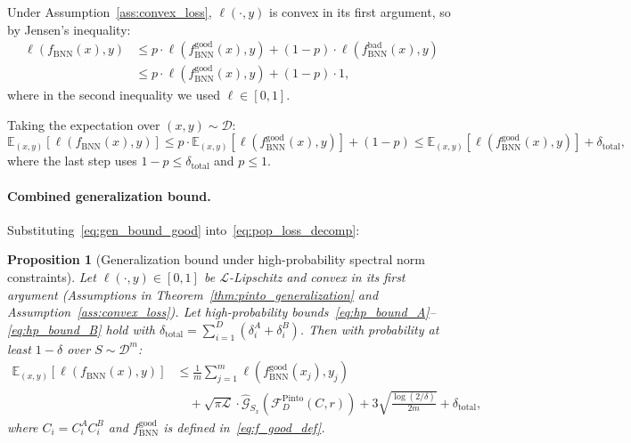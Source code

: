 \documentclass{article}
\theoremstyle{plain}
\newtheorem{proposition}[theorem]{Proposition}
\theoremstyle{definition}
\theoremstyle{remark}
\begin{document}
Under Assumption~\ref{ass:convex_loss}, $\ell(\cdot, y)$ is convex in its first argument, so by Jensen's inequality:
\begin{align}
    \ell(f_{\mathrm{BNN}}(x), y)
    &\le p \cdot \ell(f_{\mathrm{BNN}}^{\text{good}}(x), y) + (1-p) \cdot \ell(f_{\mathrm{BNN}}^{\text{bad}}(x), y) \nonumber \\
    &\le p \cdot \ell(f_{\mathrm{BNN}}^{\text{good}}(x), y) + (1-p) \cdot 1, \label{eq:convexity_bound}
\end{align}
where in the second inequality we used $\ell \in [0,1]$.

Taking the expectation over $(x,y) \sim \mathcal{D}$:
\begin{equation}\label{eq:pop_loss_decomp}
    \mathbb{E}_{(x,y)}[\ell(f_{\mathrm{BNN}}(x), y)]
    \le p \cdot \mathbb{E}_{(x,y)}[\ell(f_{\mathrm{BNN}}^{\text{good}}(x), y)] + (1-p)
    \le \mathbb{E}_{(x,y)}[\ell(f_{\mathrm{BNN}}^{\text{good}}(x), y)] + \delta_{\text{total}},
\end{equation}
where the last step uses $1-p \le \delta_{\text{total}}$ and $p \le 1$.

\paragraph{Combined generalization bound.}
Substituting~\eqref{eq:gen_bound_good} into~\eqref{eq:pop_loss_decomp}:

\begin{proposition}[Generalization bound under high-probability spectral norm constraints]
\label{prop:hp_gen_bound}
Let $\ell(\cdot,y) \in [0,1]$ be $\mathcal{L}$-Lipschitz and convex in its first argument (Assumptions in Theorem~\ref{thm:pinto_generalization} and Assumption~\ref{ass:convex_loss}). Let high-probability bounds~\eqref{eq:hp_bound_A}--\eqref{eq:hp_bound_B} hold with $\delta_{\text{total}} = \sum_{i=1}^D (\delta_i^A + \delta_i^B)$. Then with probability at least $1-\delta$ over $S \sim \mathcal{D}^m$:
\begin{align}
    \mathbb{E}_{(x,y)}[\ell(f_{\mathrm{BNN}}(x), y)] 
    &\leq \frac{1}{m}\sum_{j=1}^{m} \ell(f_{\mathrm{BNN}}^{\mathrm{good}}(x_j), y_j) \nonumber \\
    &\quad + \sqrt{\pi \mathcal{L}} \cdot \hat{\mathcal{G}}_{S_x}(\mathcal{F}_D^{\mathrm{Pinto}}(C,r)) + 3\sqrt{\frac{\log(2/\delta)}{2m}} + \delta_{\text{total}},
\end{align}
where $C_i = C_i^A C_i^B$ and $f_{\mathrm{BNN}}^{\mathrm{good}}$ is defined in~\eqref{eq:f_good_def}.
\end{proposition}
\end{document}
